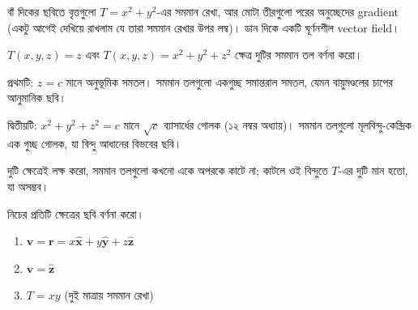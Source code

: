 \documentclass[11pt]{article}
\begin{document}
\begin{center}
\end{center}

বাঁ দিকের ছবিতে বৃত্তগুলো $T = x^{2}+y^{2}$-এর সমমান রেখা, আর মোটা তীরগুলো
পরের অনুচ্ছেদের gradient (একটু আগেই দেখিয়ে রাখলাম যে তারা সমমান রেখার উপর
লম্ব)। ডান দিকে একটি ঘূর্ণনশীল vector field।

\begin{example}
$T(x,y,z) = z$ এবং $T(x,y,z) = x^{2}+y^{2}+z^{2}$ ক্ষেত্র দুটির সমমান তল
বর্ণনা করো।
\end{example}

\begin{solbox}
প্রথমটি: $z = c$ মানে অনুভূমিক সমতল। সমমান তলগুলো একগুচ্ছ সমান্তরাল সমতল,
যেমন বায়ুমণ্ডলের চাপের আনুমানিক ছবি।

দ্বিতীয়টি: $x^{2}+y^{2}+z^{2} = c$ মানে $\sqrt{c}$ ব্যাসার্ধের গোলক
(১২ নম্বর অধ্যায়)। সমমান তলগুলো মূলবিন্দু-কেন্দ্রিক এক গুচ্ছ গোলক, যা
বিন্দু আধানের বিভবের ছবি।

দুটি ক্ষেত্রেই লক্ষ করো, সমমান তলগুলো কখনো একে অপরকে কাটে না; কাটলে ওই
বিন্দুতে $T$-এর দুটি মান হতো, যা অসম্ভব।
\end{solbox}

 নিচের প্রতিটি ক্ষেত্রের ছবি বর্ণনা করো।
\begin{enumerate}
  \item $\mathbf{v} = \mathbf{r} = x\hat{\mathbf{x}} + y\hat{\mathbf{y}}
        + z\hat{\mathbf{z}}$
  \item $\mathbf{v} = \hat{\mathbf{z}}$
  \item $T = xy$ (দুই মাত্রায় সমমান রেখা)
\end{enumerate}
\end{document}
